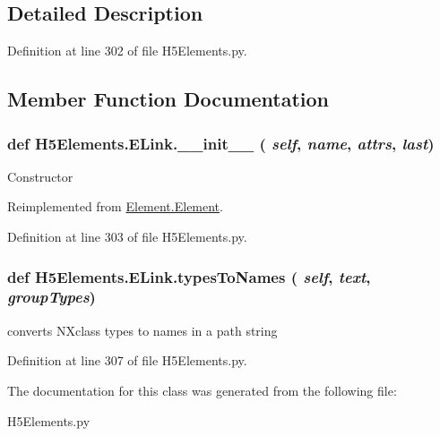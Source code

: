 \subsection{Detailed Description}


Definition at line 302 of file H5Elements.py.

\subsection{Member Function Documentation}
\hypertarget{classH5Elements_1_1ELink_a15f6a1e9476b5ef916b597243a79b0e8}{
\subsubsection[{\_\-\_\-init\_\-\_\-}]{\setlength{\rightskip}{0pt plus 5cm}def H5Elements.ELink.\_\-\_\-init\_\-\_\- ( {\em self}, \/   {\em name}, \/   {\em attrs}, \/   {\em last})}}
\label{classH5Elements_1_1ELink_a15f6a1e9476b5ef916b597243a79b0e8}
\begin{DoxyVerb}Constructor \end{DoxyVerb}
 

Reimplemented from \hyperlink{classElement_1_1Element_a359371465b7c4d21611adec7e86c3b33}{Element.Element}.

Definition at line 303 of file H5Elements.py.\hypertarget{classH5Elements_1_1ELink_acc66ee4d29d63fd921d96974e45413fc}{
\subsubsection[{typesToNames}]{\setlength{\rightskip}{0pt plus 5cm}def H5Elements.ELink.typesToNames ( {\em self}, \/   {\em text}, \/   {\em groupTypes})}}
\label{classH5Elements_1_1ELink_acc66ee4d29d63fd921d96974e45413fc}
\begin{DoxyVerb}converts NXclass types to names in a path string\end{DoxyVerb}
 

Definition at line 307 of file H5Elements.py.

The documentation for this class was generated from the following file:\begin{DoxyCompactItemize}
\item 
H5Elements.py\end{DoxyCompactItemize}
